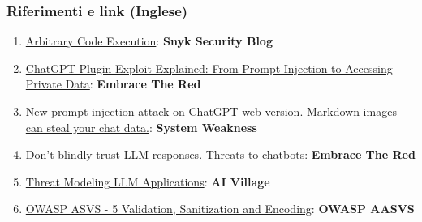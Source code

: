 \documentclass[
]{article}
\providecommand{\tightlist}{%
  \setlength{\itemsep}{0pt}\setlength{\parskip}{0pt}}
\begin{document}
\subsubsection{Riferimenti e link
(Inglese)}\label{riferimenti-e-link-inglese}

\begin{enumerate}
\def\labelenumi{\arabic{enumi}.}
\tightlist
\item
  \href{https://security.snyk.io/vuln/SNYK-PYTHON-LANGCHAIN-5411357}{Arbitrary
  Code Execution}: \textbf{Snyk Security Blog}
\item
  \href{https://embracethered.com/blog/posts/2023/chatgpt-cross-plugin-request-forgery-and-prompt-injection./}{ChatGPT
  Plugin Exploit Explained: From Prompt Injection to Accessing Private
  Data}: \textbf{Embrace The Red}
\item
  \href{https://systemweakness.com/new-prompt-injection-attack-on-chatgpt-web-version-ef717492c5c2?gi=8daec85e2116}{New
  prompt injection attack on ChatGPT web version. Markdown images can
  steal your chat data.}: \textbf{System Weakness}
\item
  \href{https://embracethered.com/blog/posts/2023/ai-injections-threats-context-matters/}{Don't
  blindly trust LLM responses. Threats to chatbots}: \textbf{Embrace The
  Red}
\item
  \href{https://aivillage.org/large\%20language\%20models/threat-modeling-llm/}{Threat
  Modeling LLM Applications}: \textbf{AI Village}
\item
  \href{https://owasp-aasvs4.readthedocs.io/en/latest/V5.html\#validation-sanitization-and-encoding}{OWASP
  ASVS - 5 Validation, Sanitization and Encoding}: \textbf{OWASP AASVS}
\end{enumerate}
\end{document}

